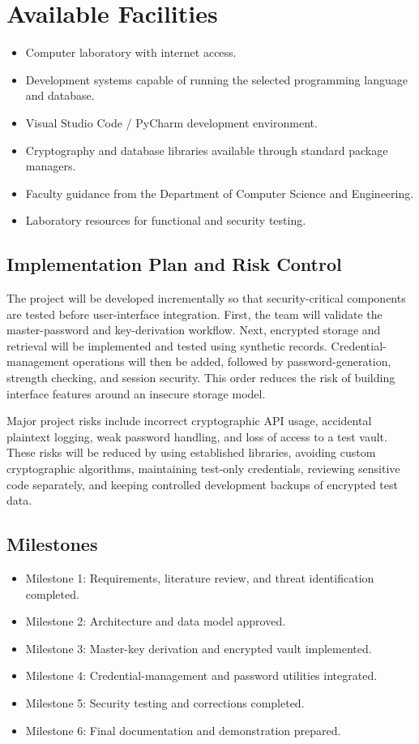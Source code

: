 \documentclass[12pt,a4paper,oneside]{report}
\begin{document}
\section{Available Facilities}

\begin{itemize}
\item Computer laboratory with internet access.
\item Development systems capable of running the selected programming language and database.
\item Visual Studio Code / PyCharm development environment.
\item Cryptography and database libraries available through standard package managers.
\item Faculty guidance from the Department of Computer Science and Engineering.
\item Laboratory resources for functional and security testing.
\end{itemize}

\subsection{Implementation Plan and Risk Control}

The project will be developed incrementally so that security-critical components are tested before user-interface integration. First, the team will validate the master-password and key-derivation workflow. Next, encrypted storage and retrieval will be implemented and tested using synthetic records. Credential-management operations will then be added, followed by password-generation, strength checking, and session security. This order reduces the risk of building interface features around an insecure storage model.

Major project risks include incorrect cryptographic API usage, accidental plaintext logging, weak password handling, and loss of access to a test vault. These risks will be reduced by using established libraries, avoiding custom cryptographic algorithms, maintaining test-only credentials, reviewing sensitive code separately, and keeping controlled development backups of encrypted test data.

\subsection{Milestones}

\begin{itemize}
\item Milestone 1: Requirements, literature review, and threat identification completed.
\item Milestone 2: Architecture and data model approved.
\item Milestone 3: Master-key derivation and encrypted vault implemented.
\item Milestone 4: Credential-management and password utilities integrated.
\item Milestone 5: Security testing and corrections completed.
\item Milestone 6: Final documentation and demonstration prepared.
\end{itemize}
\end{document}
